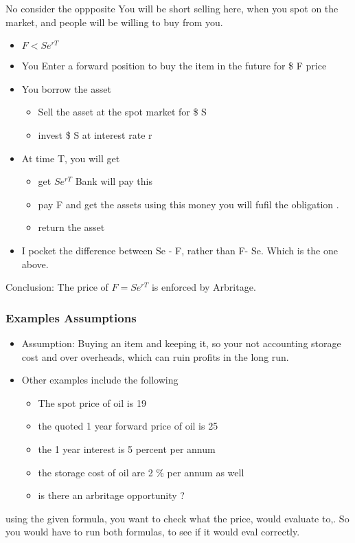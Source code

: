 \documentclass{article}
\theoremstyle{mytheoremstyle}
\theoremstyle{mytheoremstyle}
\theoremstyle{myproblemstyle}
\begin{document}
No consider the oppposite
You will be short selling here, when you spot on the market, and people will be willing to buy from you.
\begin{itemize}
	\item $ F < Se^{rT} $
	\item You Enter a forward position to buy the item in the future for \$ F price
	\item You borrow the asset
	      \begin{itemize}
		      \item Sell the asset at the spot market for \$ S
		      \item invest \$ S at interest rate r

	      \end{itemize}
	\item At time T, you will get
	      \begin{itemize}
		      \item get $Se^{rT}$ Bank will pay this
		      \item pay F and get the assets using this money you will fufil the obligation .
		      \item return the asset
	      \end{itemize}
	\item I pocket the difference between Se - F, rather than F- Se. Which is the one above.
\end{itemize}
Conclusion: The price of $F = Se^{rT}$ is enforced by Arbritage.

\subsubsection{Examples Assumptions}
\begin{itemize}
	\item Assumption: Buying an item and keeping it, so your not accounting storage cost and over overheads, which can ruin profits in the long run.
	\item Other examples include the following
	      \begin{itemize}
		      \item The spot price of oil is 19
		      \item the quoted 1 year forward price of oil is 25
		      \item the 1 year interest is 5 percent per annum
		      \item the storage cost of oil are 2 \% per annum as well
		      \item is there an arbritage opportunity ?
	      \end{itemize}
\end{itemize}
using the given formula, you want to check what the price, would evaluate to,. So you would have to run both formulas, to see if it would eval correctly.
\end{document}
